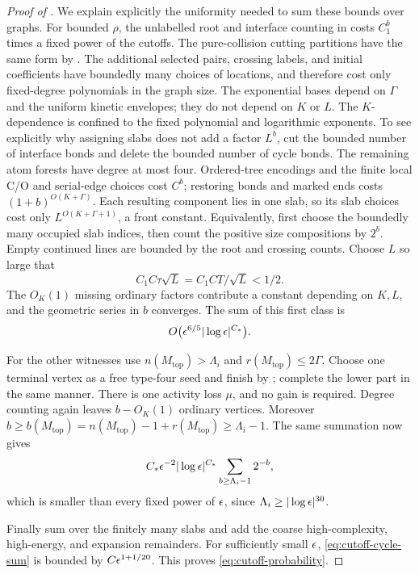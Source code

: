 \begin{proof}[Proof of ]
We explain explicitly the uniformity needed to sum these
bounds over graphs.  For bounded \(\rho\), the unlabelled
root and interface counting in
costs \(C_1^b\) times a fixed power of the cutoffs.
The pure-collision cutting partitions have the same form
by .  The additional selected
pairs, crossing labels, and initial coefficients have
boundedly many choices of locations, and therefore cost
only fixed-degree polynomials in the graph size.
The exponential bases depend on \(\Gamma\) and the
uniform kinetic envelopes; they do not depend on \(K\)
or \(L\).  The \(K\)-dependence is confined to the fixed
polynomial and logarithmic exponents.
To see explicitly why assigning slabs does not add a factor
\(L^b\), cut the bounded number of interface bonds and delete
the bounded number of cycle bonds.  The remaining atom forests
have degree at most four.  Ordered-tree encodings and the finite
local C/O and serial-edge choices cost \(C^b\); restoring bonds
and marked ends costs \((1+b)^{O(K+\Gamma)}\).
Each resulting component lies in one slab, so its slab choices
cost only \(L^{O(K+\Gamma+1)}\), a front constant.
Equivalently, first choose the boundedly many occupied slab
indices, then count the positive size compositions by \(2^b\).
Empty continued lines are bounded by the root and crossing counts.
Choose \(L\) so large that
\[
 C_1 C\tau\sqrt L=C_1CT/\sqrt L<1/2 .
\]
The \(O_K(1)\) missing ordinary factors contribute a
constant depending on \(K,L\), and the geometric series
in \(b\) converges.  The sum of this first class is
\begin{equation}\label{eq:cutoff-cycle-sum}
 O\bigl(\epsilon^{6/5}|\log\epsilon|^{C_*}\bigr).
\end{equation}

For the other witnesses use
\(n(M_{\mathrm{top}})>\Lambda_i\) and
\(r(M_{\mathrm{top}})\leq2\Gamma\).
Choose one terminal vertex as a free type-four seed and
finish by ; complete the lower
part in the same manner.  There is one activity loss
\(\mu\), and no gain is required.
Degree counting again leaves \(b-O_K(1)\) ordinary
vertices.  Moreover
\(b\geq b(M_{\mathrm{top}})
       =n(M_{\mathrm{top}})-1+r(M_{\mathrm{top}})
       \geq\Lambda_i-1\).
The same summation now gives
\[
 C_*\epsilon^{-2}|\log\epsilon|^{C_*}
       \sum_{b\geq\Lambda_i-1}2^{-b},
\]
which is smaller than every fixed power of \(\epsilon\),
since \(\Lambda_i\geq|\log\epsilon|^{30}\).

Finally sum over the finitely many slabs and add the
coarse high-complexity, high-energy, and expansion
remainders.  For sufficiently small \(\epsilon\),
\eqref{eq:cutoff-cycle-sum} is bounded by
\(C\epsilon^{1+1/20}\).  This proves
\eqref{eq:cutoff-probability}.


\end{proof}
